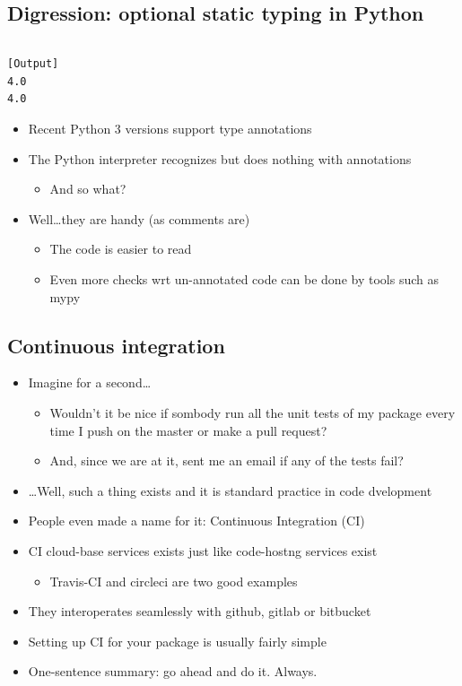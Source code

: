 \subsection{Digression: optional static typing in Python}

\inputminted{python}{snippets/type_annotation.py}

\begin{verbatim}
[Output]
4.0
4.0
\end{verbatim} 

  \begin{itemize}
  \item Recent Python 3 versions support type annotations
  \item \alert{The Python interpreter recognizes but does nothing with
    annotations}
    \begin{itemize}
    \item And so what?
    \end{itemize}
  \item Well\ldots they are handy (as comments are)
    \begin{itemize}
    \item The code is easier to read
    \item Even more checks wrt un-annotated code can be done by tools such as
      mypy
    \end{itemize}
  \end{itemize}

\subsection{Continuous integration}

  \begin{itemize}
  \item Imagine for a second\ldots
    \begin{itemize}
    \item Wouldn't it be nice if sombody run all the unit tests of my
      package every time I push on the master or make a pull request?
    \item And, since we are at it, sent me an email if any of the tests fail?
    \end{itemize}
  \item \ldots Well, such a thing exists and it is standard practice in
    code dvelopment
  \item People even made a name for it: \alert{Continuous Integration (CI)}
  \item CI cloud-base services exists just like code-hostng services exist
    \begin{itemize}
    \item Travis-CI and circleci are two good examples
    \end{itemize}
  \item They interoperates seamlessly with github, gitlab or bitbucket
  \item Setting up CI for your package is usually fairly simple
  \item \alert{One-sentence summary: go ahead and do it. Always.}
  \end{itemize}
  
